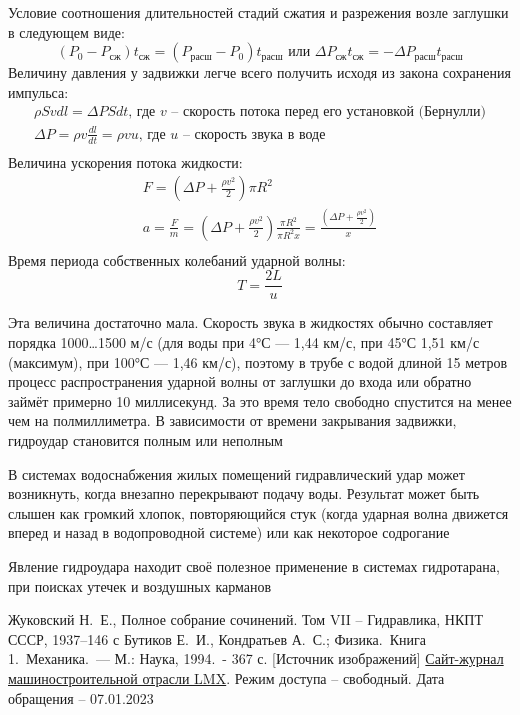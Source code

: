 \documentclass[a4paper, 14pt]{article}
\begin{document}
    \noindent Условие соотношения длительностей стадий сжатия и разрежения возле заглушки в следующем виде:
    \[ (P_0 - P_{\text{сж}}) t_{\text{сж}} = (P_{\text{расш}} - P_0) t_{\text{расш}} \text{ или } \Delta P_{\text{сж}}
    t_{\text{сж}} = -\Delta P_{\text{расш}} t_{\text{расш}} \]
    Величину давления у задвижки легче всего получить исходя из закона сохранения импульса:
    \begin{gather*}
        \rho S v dl = \Delta P S dt \text{, где } v \text{ -- скорость потока перед его установкой (Бернулли)}\\
        \Delta P = \rho v \frac{dl}{dt} = \rho v u \text{, где } u \text{ -- скорость звука в воде}\\
    \end{gather*}
    Величина ускорения потока жидкости:
    \begin{gather*}
        F = (\Delta P + \frac{\rho v^2}{2}) \pi R^2\\
        a = \frac{F}{m} = (\Delta P + \frac{\rho v^2}{2}) \frac{\pi R^2}{\pi R^2 x} = \frac{(\Delta P + \frac{\rho
        v^2}{2})}{x}\\
    \end{gather*}
    Время периода собственных колебаний ударной волны:
    \[ T = \frac{2L}{u} \]

    Эта величина достаточно мала.
    Скорость звука в жидкостях обычно составляет порядка 1000\dots1500 м/с (для воды при 4°С — 1,44 км/с, при 45°С 1,51
    км/с (максимум), при 100°С — 1,46 км/с), поэтому в трубе с водой длиной 15 метров процесс распространения ударной
    волны от заглушки до входа или обратно займёт примерно 10 миллисекунд.
    За это время тело свободно спустится на менее чем на полмиллиметра.
    В зависимости от времени закрывания задвижки, гидроудар становится полным или неполным

    В системах водоснабжения жилых помещений гидравлический удар может возникнуть, когда внезапно перекрывают подачу
    воды.
    Результат может быть слышен как громкий хлопок, повторяющийся стук (когда ударная волна движется вперед и назад в
    водопроводной системе) или как некоторое содрогание

    Явление гидроудара находит своё полезное применение в системах гидротарана, при поисках утечек и воздушных карманов

    \begin{thebibliography}{}
         Жуковский Н.~Е., Полное собрание сочинений.
        Том VII -- Гидравлика, НКПТ СССР, 1937--146 с
         Бутиков Е.~И., Кондратьев А.~С.; Физика.~Книга 1.~Механика.~— М.: Наука, 1994.~- 367 с.
         [Источник изображений] \href{https://lmx.ucoz.ru/dlyabloga/gidravlika_udar.pdf}{Сайт-журнал
        машиностроительной отрасли LMX}.
        Режим доступа -- свободный.
        Дата обращения -- 07.01.2023
    \end{thebibliography}
\end{document}

